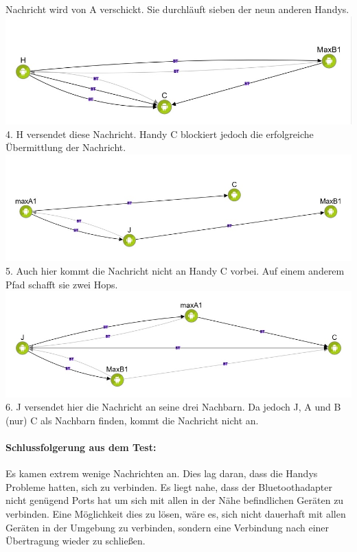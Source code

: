Nachricht wird von A verschickt. Sie durchläuft sieben der neun anderen Handys.\\
\includegraphics[width=1.0\textwidth]{belege/grosstests/Bilder/Miserfolg3.jpg}\\ 4. H versendet
diese Nachricht. Handy C blockiert jedoch die erfolgreiche Übermittlung
der Nachricht. \\
\includegraphics[width=1.0\textwidth]{belege/grosstests/Bilder/Miserfolg2.jpg}\\
5. Auch hier kommt die Nachricht nicht an Handy C vorbei. Auf einem
anderem Pfad schafft sie zwei Hops.\\
\includegraphics[width=1.0\textwidth]{belege/grosstests/Bilder/Miserfolg1.jpg}\\ 6. J versendet
hier die Nachricht an seine drei Nachbarn. Da jedoch J, A und B (nur) C als
Nachbarn finden, kommt die Nachricht nicht an.\\

\paragraph{Schlussfolgerung aus dem Test:}

Es kamen extrem wenige Nachrichten an. Dies lag daran, dass die Handys
Probleme hatten, sich zu verbinden. Es liegt nahe, dass der
Bluetoothadapter nicht genügend Ports hat um sich mit allen in der Nähe
befindlichen Geräten zu verbinden. Eine Möglichkeit dies zu lösen, wäre
es, sich nicht dauerhaft mit allen Geräten in der Umgebung zu verbinden,
sondern eine Verbindung nach einer Übertragung wieder zu schließen.

